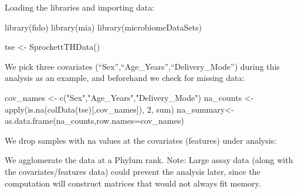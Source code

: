 \documentclass[
]{book}
\newenvironment{Shaded}{\begin{snugshade}}{\end{snugshade}}
\newcommand{\AttributeTok}[1]{\textcolor[rgb]{0.77,0.63,0.00}{#1}}
\newcommand{\DecValTok}[1]{\textcolor[rgb]{0.00,0.00,0.81}{#1}}
\newcommand{\FunctionTok}[1]{\textcolor[rgb]{0.00,0.00,0.00}{#1}}
\newcommand{\NormalTok}[1]{#1}
\newcommand{\OtherTok}[1]{\textcolor[rgb]{0.56,0.35,0.01}{#1}}
\newcommand{\SpecialCharTok}[1]{\textcolor[rgb]{0.00,0.00,0.00}{#1}}
\newcommand{\StringTok}[1]{\textcolor[rgb]{0.31,0.60,0.02}{#1}}
\begin{document}
Loading the libraries and importing data:

\begin{Shaded}
\begin{Highlighting}[]
\FunctionTok{library}\NormalTok{(fido)}
\FunctionTok{library}\NormalTok{(mia)}
\FunctionTok{library}\NormalTok{(microbiomeDataSets)}

\NormalTok{tse }\OtherTok{\textless{}{-}} \FunctionTok{SprockettTHData}\NormalTok{()}
\end{Highlighting}
\end{Shaded}

We pick three covariates (``Sex'',``Age\_Years'',``Delivery\_Mode'') during this
analysis as an example, and beforehand we check for missing data:

\begin{Shaded}
\begin{Highlighting}[]
\NormalTok{cov\_names }\OtherTok{\textless{}{-}} \FunctionTok{c}\NormalTok{(}\StringTok{"Sex"}\NormalTok{,}\StringTok{"Age\_Years"}\NormalTok{,}\StringTok{"Delivery\_Mode"}\NormalTok{)}
\NormalTok{na\_counts }\OtherTok{\textless{}{-}} \FunctionTok{apply}\NormalTok{(}\FunctionTok{is.na}\NormalTok{(}\FunctionTok{colData}\NormalTok{(tse)[,cov\_names]), }\DecValTok{2}\NormalTok{, sum)}
\NormalTok{na\_summary}\OtherTok{\textless{}{-}}\FunctionTok{as.data.frame}\NormalTok{(na\_counts,}\AttributeTok{row.names=}\NormalTok{cov\_names)}
\end{Highlighting}
\end{Shaded}

We drop samples with na values at the covariates (features) under analysis:

\begin{Shaded}
\end{Shaded}

We agglomerate the data at a Phylum rank.
Note: Large assay data (along with the covariates/features data) could prevent the analysis later,
since the computation will construct matrices that would not always fit memory.
\end{document}
